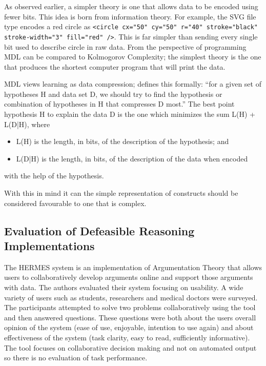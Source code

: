 As observed earlier, a simpler theory is one that allows data to be encoded using fewer bits. This idea is born from information theory. For example, the SVG file type encodes a red circle as \lstinline{<circle cx="50" cy="50" r="40" stroke="black" stroke-width="3" fill="red" />}. This is far simpler than sending every single bit used to describe circle in raw data. From the perspective of programming MDL can be compared to Kolmogorov Complexity; the simplest theory is the one that produces the shortest computer program that will print the data.

MDL views learning as data compression; \cite{grunwald2005tutorial} defines this formally: ``for a given set of hypotheses H and data set D, we should try to find the hypothesis or combination of hypotheses in H that compresses D most.'' The best point hypothesis H to explain the data D is the one which minimizes the sum L(H) + L(D|H), where
\begin{itemize}
  \item L(H) is the length, in bits, of the description of the hypothesis; and
  \item L(D|H) is the length, in bits, of the description of the data when encoded
\end{itemize}
with the help of the hypothesis.

With this in mind it can the simple representation of constructs should be considered favourable to one that is complex.

\subsection{Evaluation of Defeasible Reasoning Implementations}

The HERMES system\cite{karacapilidis2001computer} is an implementation of Argumentation Theory that allows users to collaboratively develop arguments online and support those arguments with data. The authors evaluated their system focusing on usability. A wide variety of users such as students, researchers and medical doctors were surveyed. The participants attempted to solve two problems collaboratively using the tool and then answered questions. These questions were both about the users overall opinion of the system (ease of use, enjoyable, intention to use again) and about effectiveness of the system (task clarity, easy to read, sufficiently informative). The tool focuses on collaborative decision making and not on automated output so there is no evaluation of task performance.

